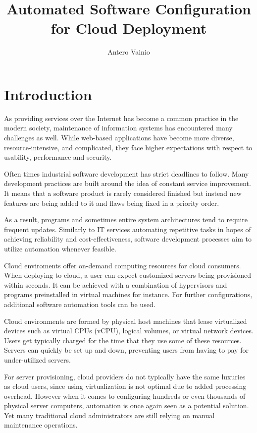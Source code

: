 \documentclass[officiallayout]{tktla}
\title{Automated Software Configuration for Cloud Deployment}
\author{Antero Vainio}
\begin{document}
\frontmatter

\maketitle

\tableofcontents

\mainmatter

\chapter{Introduction}

As providing services over the Internet has become a common practice in the
modern society, maintenance of information systems has encountered many
challenges as well. While web-based applications have become more diverse,
resource-intensive, and complicated, they face higher expectations with respect
to usability, performance and security.

Often times industrial software development has strict deadlines to follow.
Many development practices are built around the idea of constant service
improvement. It means that a software product is rarely considered finished but
instead new features are being added to it and flaws being fixed in a priority
order.

As a result, programs and sometimes entire system architectures tend to require
frequent updates. Similarly to IT services automating repetitive tasks in hopes
of achieving reliability and cost-effectiveness, software development processes
aim to utilize automation whenever feasible.

Cloud enviroments offer on-demand computing resources for cloud consumers. When
deploying to cloud, a user can expect customized servers being provisioned
within seconds. It can be achieved with a combination of hypervisors and
programs preinstalled in virtual machines for instance. For further
configurations, additional software automation tools can be used.

Cloud environments are formed by physical host machines that lease virtualized
devices such as virtual CPUs (vCPU), logical volumes, or virtual network
devices. Users get typically charged for the time that they use some of these
resources. Servers can quickly be set up and down, preventing users from
having to pay for under-utilized servers.

For server provisioning, cloud providers do not typically have the same
luxuries as cloud users, since using virtualization is not optimal due to added
processing overhead. However when it comes to configuring hundreds or even
thousands of physical server computers, automation is once again seen as a
potential solution. Yet many traditional cloud administrators are still relying
on manual maintenance operations.
\end{document}
